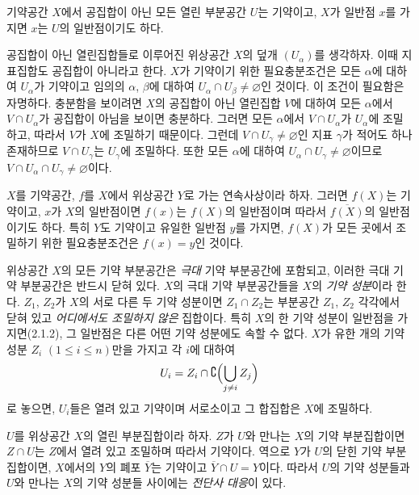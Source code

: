 \begin{env}[2.1.4]
\label{0.2.1.4-ko}
기약공간 $X$에서 공집합이 아닌 모든 열린 부분공간 $U$는 기약이고, $X$가 일반점 $x$를 가지면 $x$는 $U$의 일반점이기도 하다.

공집합이 아닌 열린집합들로 이루어진 위상공간 $X$의 덮개 $(U_\alpha)$를 생각하자. 이때 지표집합도 공집합이 아니라고 한다. $X$가 기약이기 위한 필요충분조건은 모든 $\alpha$에 대하여 $U_\alpha$가 기약이고 임의의 $\alpha$, $\beta$에 대하여 $U_\alpha\cap U_\beta\neq\varnothing$인 것이다. 이 조건이 필요함은 자명하다. 충분함을 보이려면 $X$의 공집합이 아닌 열린집합 $V$에 대하여 모든 $\alpha$에서 $V\cap U_\alpha$가 공집합이 아님을 보이면 충분하다. 그러면 모든 $\alpha$에서 $V\cap U_\alpha$가 $U_\alpha$에 조밀하고, 따라서 $V$가 $X$에 조밀하기 때문이다. 그런데 $V\cap U_\gamma\neq\varnothing$인 지표 $\gamma$가 적어도 하나 존재하므로 $V\cap U_\gamma$는 $U_\gamma$에 조밀하다. 또한 모든 $\alpha$에 대하여 $U_\alpha\cap U_\gamma\neq\varnothing$이므로 $V\cap U_\alpha\cap U_\gamma\neq\varnothing$이다.
\end{env}


\begin{env}[2.1.5]
\label{0.2.1.5-ko}
$X$를 기약공간, $f$를 $X$에서 위상공간 $Y$로 가는 연속사상이라 하자. 그러면 $f(X)$는 기약이고, $x$가 $X$의 일반점이면 $f(x)$는 $f(X)$의 일반점이며 따라서 $\overline{f(X)}$의 일반점이기도 하다. 특히 $Y$도 기약이고 유일한 일반점 $y$를 가지면, $f(X)$가 모든 곳에서 조밀하기 위한 필요충분조건은 $f(x)=y$인 것이다.
\end{env}

\begin{env}[2.1.6]
\label{0.2.1.6-ko}
위상공간 $X$의 모든 기약 부분공간은 \emph{극대} 기약 부분공간에 포함되고, 이러한 극대 기약 부분공간은 반드시 닫혀 있다. $X$의 극대 기약 부분공간들을 $X$의 \emph{기약 성분}이라 한다. $Z_1$, $Z_2$가 $X$의 서로 다른 두 기약 성분이면 $Z_1\cap Z_2$는 부분공간 $Z_1$, $Z_2$ 각각에서 닫혀 있고 \emph{어디에서도 조밀하지 않은} 집합이다. 특히 $X$의 한 기약 성분이 일반점을 가지면(2.1.2), 그 일반점은 다른 어떤 기약 성분에도 속할 수 없다. $X$가 유한 개의 기약 성분 $Z_i$ $(1\leq i\leq n)$만을 가지고 각 $i$에 대하여
\[
  U_i=Z_i\cap\complement\Bigl(\bigcup_{j\neq i}Z_j\Bigr)
\]
로 놓으면, $U_i$들은 열려 있고 기약이며 서로소이고 그 합집합은 $X$에 조밀하다.

$U$를 위상공간 $X$의 열린 부분집합이라 하자. $Z$가 $U$와 만나는 $X$의 기약 부분집합이면 $Z\cap U$는 $Z$에서 열려 있고 조밀하며 따라서 기약이다. 역으로 $Y$가 $U$의 닫힌 기약 부분집합이면, $X$에서의 $Y$의 폐포 $\overline Y$는 기약이고 $\overline Y\cap U=Y$이다. 따라서 $U$의 기약 성분들과 $U$와 만나는 $X$의 기약 성분들 사이에는 \emph{전단사 대응}이 있다.
\end{env}

